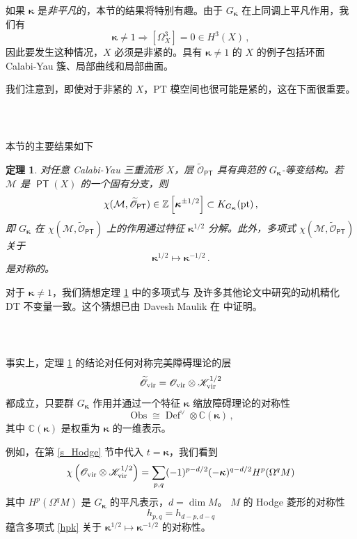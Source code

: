 \documentclass[12pt]{article}
\newcommand{\C}{\mathbb{C}}
\newcommand{\Z}{\mathbb{Z}}
\newcommand{\Ovir}{\mathscr{O}_{\textup{vir}}}
\newcommand{\Kvir}{\mathscr{K}_{\textup{vir}}}
\newcommand{\cM}{\mathcal{M}}
\DeclareMathOperator{\Def}{Def}
\DeclareMathOperator{\Obs}{Obs}
\DeclareMathOperator{\PT}{\mathsf{PT}}
\DeclareMathOperator{\vir}{vir}
\newcommand{\tO}{\widetilde{\mathscr{O}}}
\newcommand{\pt}{\textup{pt}}
\newcommand{\bk}{\boldsymbol{\kappa}}
\newcommand{\Gk}{G_{\bk}}
\newtheorem{Theorem}{定理}
\theoremstyle{definition}
\begin{document}
如果 $\bk$ 是\emph{非平凡}的，本节的结果将特别有趣。由于 $\Gk$ 在上同调上平凡作用，我们有
$$
\bk \ne 1  \Rightarrow [\Omega^3_X] = 0 \in H^3(X) \,,
$$
因此要发生这种情况，$X$ 必须是非紧的。具有 $\bk\ne 1$ 的 $X$ 的例子包括环面 Calabi-Yau 簇、局部曲线和局部曲面。

我们注意到，即使对于非紧的 $X$，PT 模空间也很可能是紧的，这在下面很重要。

\subsubsection{\ }

本节的主要结果如下

\begin{Theorem}\label{t_kappa}
对任意 Calabi-Yau 三重流形 $X$，层 $\tO_{\PT}$ 具有典范的 $\Gk$-等变结构。若 $\cM$ 是 $\PT(X)$ 的一个固有分支，则
$$
\chi(\cM,\tO_{\PT} ) \in \Z\left[\bk^{\pm 1/2}\right] \subset
K_{\Gk} (\pt) \,,
$$
即 $\Gk$ 在 $\chi(\cM,\tO_{\PT} )$ 上的作用通过特征 $\bk^{1/2}$ 分解。此外，多项式 $\chi(\cM,\tO_{\PT} )$ 关于
$$
\bk^{1/2} \mapsto \bk^{-1/2}\,.
$$
是对称的。
\end{Theorem}

对于 $\bk\ne 1$，我们猜想定理 \ref{t_kappa} 中的多项式与 \cite{BBS,BJM,KS} 及许多其他论文中研究的动机精化 DT 不变量一致。这个猜想已由 Davesh Maulik 在 \cite{Dmot} 中证明。

\subsubsection{\ }

事实上，定理 \ref{t_kappa} 的结论对任何对称完美障碍理论的层
$$
\tO_{\vir} = \Ovir \otimes \Kvir^{1/2}
$$
都成立，只要群 $\Gk$ 作用并通过一个特征 $\bk$ 缩放障碍理论的对称性
\begin{equation}
\Obs \cong \Def^{\vee} \otimes \C(\bk) \label{symm_bk}\,,
\end{equation}
其中 $\C(\bk)$ 是权重为 $\bk$ 的一维表示。

例如，在第 \ref{s_Hodge} 节中代入 $t=\bk$，我们看到
\begin{equation}
\chi \left(\Ovir \otimes \Kvir^{1/2}\right) =
\sum_{p,q} (-1)^{p-d/2} (-\bk)^{q-d/2} H^p(\Omega^q M)
\label{hpk}
\end{equation}
其中 $H^p(\Omega^q M)$ 是 $\Gk$ 的平凡表示，$d = \dim M$。
$M$ 的 Hodge 菱形的对称性
$$
h_{p,q} = h_{d-p,d-q}
$$
蕴含多项式 \eqref{hpk} 关于 $\bk^{1/2} \mapsto \bk^{-1/2}$ 的对称性。

\subsubsection{\ }
\end{document}
